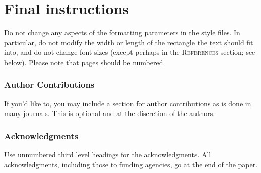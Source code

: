 \documentclass{article} %
\begin{document}
\section{Final instructions}
Do not change any aspects of the formatting parameters in the style files.
In particular, do not modify the width or length of the rectangle the text
should fit into, and do not change font sizes (except perhaps in the
\textsc{References} section; see below). Please note that pages should be
numbered.


\subsubsection*{Author Contributions}
If you'd like to, you may include  a section for author contributions as is done
in many journals. This is optional and at the discretion of the authors.

\subsubsection*{Acknowledgments}
Use unnumbered third level headings for the acknowledgments. All
acknowledgments, including those to funding agencies, go at the end of the paper.

\label{last_page}



\end{document}
